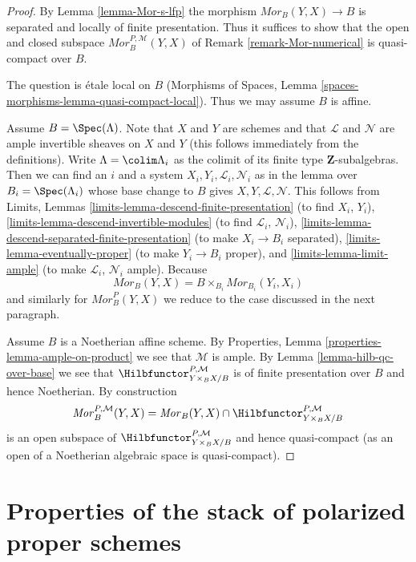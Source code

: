 \begin{proof}
By Lemma \ref{lemma-Mor-s-lfp} the morphism $\mathit{Mor}_B(Y, X) \to B$
is separated and locally of finite presentation. Thus it suffices to
show that the open and closed subspace $\mathit{Mor}^{P, \mathcal{M}}_B(Y, X)$
of Remark \ref{remark-Mor-numerical} is quasi-compact over $B$.

\medskip\noindent
The question is \'etale local on $B$
(Morphisms of Spaces, Lemma \ref{spaces-morphisms-lemma-quasi-compact-local}).
Thus we may assume $B$ is affine.

\medskip\noindent
Assume $B = \Spec(\Lambda)$. Note that $X$ and
$Y$ are schemes and that $\mathcal{L}$ and $\mathcal{N}$ are ample
invertible sheaves on $X$ and $Y$ (this follows immediately from the
definitions). Write $\Lambda = \colim \Lambda_i$ as the
colimit of its finite type $\mathbf{Z}$-subalgebras. Then
we can find an $i$ and a system $X_i, Y_i, \mathcal{L}_i, \mathcal{N}_i$
as in the lemma over $B_i = \Spec(\Lambda_i)$ whose base change to
$B$ gives $X, Y, \mathcal{L}, \mathcal{N}$. This follows from
Limits, Lemmas
\ref{limits-lemma-descend-finite-presentation} (to find $X_i$, $Y_i$),
\ref{limits-lemma-descend-invertible-modules} (to find $\mathcal{L}_i$,
$\mathcal{N}_i$), \ref{limits-lemma-descend-separated-finite-presentation}
(to make $X_i \to B_i$ separated), \ref{limits-lemma-eventually-proper}
(to make $Y_i \to B_i$ proper), and \ref{limits-lemma-limit-ample}
(to make $\mathcal{L}_i$, $\mathcal{N}_i$ ample).
Because
$$
\mathit{Mor}_B(Y, X) = B \times_{B_i} \mathit{Mor}_{B_i}(Y_i, X_i)
$$
and similarly for $\mathit{Mor}^P_B(Y, X)$ we reduce
to the case discussed in the next paragraph.

\medskip\noindent
Assume $B$ is a Noetherian affine scheme. By
Properties, Lemma \ref{properties-lemma-ample-on-product}
we see that $\mathcal{M}$ is ample. By Lemma \ref{lemma-hilb-qc-over-base}
we see that $\Hilbfunctor^{P, \mathcal{M}}_{Y \times_B X/B}$ is of
finite presentation over $B$ and hence Noetherian.
By construction
$$
\mathit{Mor}^{P, \mathcal{M}}_B(Y, X) =
\mathit{Mor}_B(Y, X) \cap
\Hilbfunctor^{P, \mathcal{M}}_{Y \times_B X/B}
$$
is an open subspace of $\Hilbfunctor^{P, \mathcal{M}}_{Y \times_B X/B}$ and
hence quasi-compact (as an open of a Noetherian algebraic space
is quasi-compact).
\end{proof}






\section{Properties of the stack of polarized proper schemes}
\label{section-polarized}

